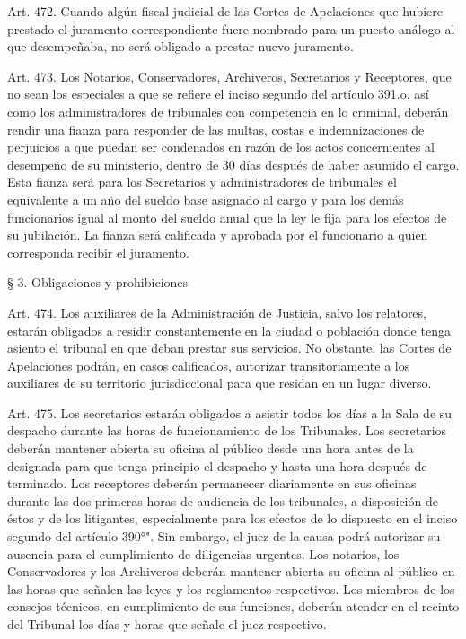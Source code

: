     Art. 472. Cuando algún fiscal judicial de las Cortes de Apelaciones que hubiere prestado el juramento correspondiente fuere nombrado para un puesto análogo al que desempeñaba, no será obligado a prestar nuevo juramento.


    Art. 473. Los Notarios, Conservadores, Archiveros, Secretarios y Receptores, que no sean los especiales a que se refiere el inciso segundo del artículo 391.o, así como los administradores de tribunales con competencia en lo criminal, deberán rendir una fianza para responder de las multas, costas e indemnizaciones de perjuicios a que puedan ser condenados en razón de los actos concernientes al desempeño de su ministerio, dentro de 30 días después de haber asumido el cargo.
    Esta fianza será para los Secretarios y administradores de tribunales el equivalente a un año del sueldo base asignado al cargo y para los demás funcionarios igual al monto del sueldo anual que la ley le fija para los efectos de su jubilación.
    La fianza será calificada y aprobada por el funcionario a quien corresponda recibir el juramento.



    § 3. Obligaciones y prohibiciones


    Art. 474. Los auxiliares de la Administración de Justicia, salvo los relatores, estarán obligados a residir constantemente en la ciudad o población donde tenga asiento el tribunal en que deban prestar sus servicios.
    No obstante, las Cortes de Apelaciones podrán, en casos calificados, autorizar transitoriamente a los auxiliares de su territorio jurisdiccional para que residan en un lugar diverso.




    Art. 475. Los secretarios estarán obligados a asistir todos los días a la Sala de su despacho durante las horas de funcionamiento de los Tribunales.
    Los secretarios deberán mantener abierta su oficina al público desde una hora antes de la designada para que tenga principio el despacho y hasta una hora después de terminado.
    Los receptores deberán permanecer diariamente en sus oficinas durante las dos primeras horas de audiencia de los tribunales, a disposición de éstos y de los litigantes, especialmente para los efectos de lo dispuesto en el inciso segundo del artículo 390°".
    Sin embargo, el juez de la causa podrá autorizar su ausencia para el cumplimiento de diligencias urgentes.
    Los notarios, los Conservadores y los Archiveros deberán mantener abierta su oficina al público en las horas que señalen las leyes y los reglamentos respectivos.
    Los miembros de los consejos técnicos, en cumplimiento de sus funciones, deberán atender en el recinto del Tribunal los días y horas que señale el juez respectivo.





